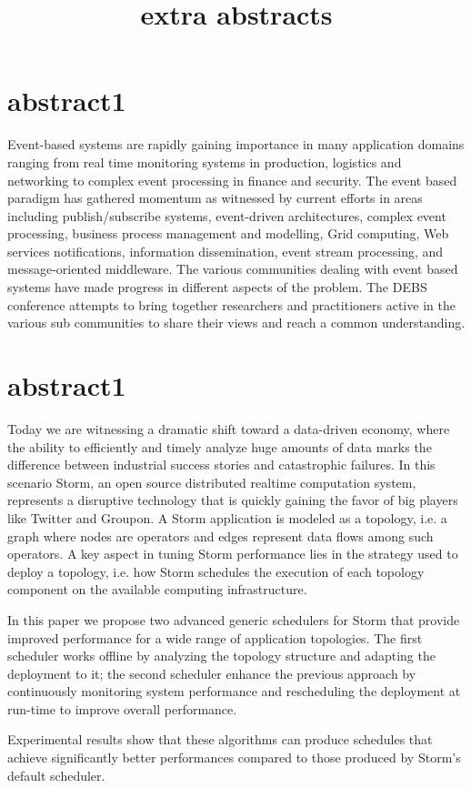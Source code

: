 \documentclass[]{article}
\title{extra abstracts}
\author{}
\begin{document}
\section{abstract1}

Event-based systems are rapidly gaining importance in many application domains ranging from real time monitoring systems in production, logistics and networking to complex event processing in finance and security. The event based paradigm has gathered momentum as witnessed by current efforts in areas including publish/subscribe systems, event-driven architectures, complex event processing, business process management and modelling, Grid computing, Web services notifications, information dissemination, event stream processing, and message-oriented middleware. The various communities dealing with event based systems have made progress in different aspects of the problem. The DEBS conference attempts to bring together researchers and practitioners active in the various sub communities to share their views and reach a common understanding.

\section{abstract1}
Today we are witnessing a dramatic shift toward a data-driven economy, where the ability to efficiently and timely analyze huge amounts of data marks the difference between industrial success stories and catastrophic failures. In this scenario Storm, an open source distributed realtime computation system, represents a disruptive technology that is quickly gaining the favor of big players like Twitter and Groupon. A Storm application is modeled as a topology, i.e. a graph where nodes are operators and edges represent data flows among such operators. A key aspect in tuning Storm performance lies in the strategy used to deploy a topology, i.e. how Storm schedules the execution of each topology component on the available computing infrastructure.

In this paper we propose two advanced generic schedulers for Storm that provide improved performance for a wide range of application topologies. The first scheduler works offline by analyzing the topology structure and adapting the deployment to it; the second scheduler enhance the previous approach by continuously monitoring system performance and rescheduling the deployment at run-time to improve overall performance. 

Experimental results show that these algorithms can produce schedules that achieve significantly better performances compared to those produced by Storm's default scheduler.
\end{document}
